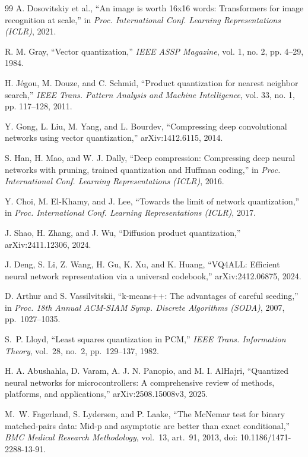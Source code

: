\documentclass[conference]{IEEEtran}
\begin{document}
\begin{thebibliography}{99}
A. Dosovitskiy et al., ``An image is worth 16x16 words: Transformers for image recognition at scale,'' in \emph{Proc. International Conf. Learning Representations (ICLR)}, 2021.

R. M. Gray, ``Vector quantization,'' \emph{IEEE ASSP Magazine}, vol. 1, no. 2, pp. 4--29, 1984.

H. J\'egou, M. Douze, and C. Schmid, ``Product quantization for nearest neighbor search,'' \emph{IEEE Trans. Pattern Analysis and Machine Intelligence}, vol. 33, no. 1, pp. 117--128, 2011.

Y. Gong, L. Liu, M. Yang, and L. Bourdev, ``Compressing deep convolutional networks using vector quantization,'' arXiv:1412.6115, 2014.

S. Han, H. Mao, and W. J. Dally, ``Deep compression: Compressing deep neural networks with pruning, trained quantization and Huffman coding,'' in \emph{Proc. International Conf. Learning Representations (ICLR)}, 2016.

Y. Choi, M. El-Khamy, and J. Lee, ``Towards the limit of network quantization,'' in \emph{Proc. International Conf. Learning Representations (ICLR)}, 2017.

J. Shao, H. Zhang, and J. Wu, ``Diffusion product quantization,'' arXiv:2411.12306, 2024.

J. Deng, S. Li, Z. Wang, H. Gu, K. Xu, and K. Huang, ``VQ4ALL: Efficient neural network representation via a universal codebook,'' arXiv:2412.06875, 2024.

D. Arthur and S. Vassilvitskii, ``k-means{+}{+}: The advantages of careful seeding,'' in \emph{Proc. 18th Annual ACM-SIAM Symp. Discrete Algorithms (SODA)}, 2007, pp.~1027--1035.

S.~P. Lloyd, ``Least squares quantization in PCM,'' \emph{IEEE Trans. Information Theory}, vol.~28, no.~2, pp.~129--137, 1982.

H. A. Abushahla, D. Varam, A. J. N. Panopio, and M. I. AlHajri, ``Quantized neural networks for microcontrollers: A comprehensive review of methods, platforms, and applications,'' arXiv:2508.15008v3, 2025.

M.~W. Fagerland, S. Lydersen, and P. Laake, ``The McNemar test for binary matched-pairs data: Mid-p and asymptotic are better than exact conditional,'' \emph{BMC Medical Research Methodology}, vol.~13, art.~91, 2013, doi: 10.1186/1471-2288-13-91.


\end{thebibliography}
\end{document}
